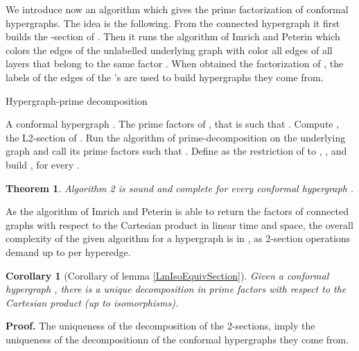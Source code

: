 \documentclass[copyright]{eptcs}
\def\Proof{{\noindent \bf Proof. }}
\def\QED{{\hfill  \medskip}}
\newtheorem{Theo}{Theorem}
\newtheorem{Cor}{Corollary}
\newcommand{\chg}[1]{{#1}}
\begin{document}
We introduce now an algorithm which gives the prime factorization of conformal hypergraphs. The idea is the following. From the connected hypergraph  it first builds the -section  of . Then it runs the algorithm of Imrich and Peterin which colors the edges of the unlabelled underlying graph  with color  all edges of all layers that belong to the same factor . When obtained the factorization  of , the labels of the edges of the 's are used to build hypergraphs  they come from.

    \begin{algorithm}[!h]
        \caption{Hypergraph-prime decomposition}
        \label{algo2}
        \begin{algorithmic}[1]
        \REQUIRE A conformal hypergraph .
        \ENSURE The prime factors of , that is  such that
        .
    \STATE Compute , the L2-section of .
    \STATE Run the algorithm of prime-decomposition on the underlying graph  and call  its prime factors such that .
    \STATE Define  as the restriction of  to , , and build , for every .
\RETURN 
\end{algorithmic}
    \end{algorithm}


\begin{Theo} Algorithm 2 is sound and complete for every conformal hypergraph .
\end{Theo}


As the algorithm of Imrich and Peterin is able to return the factors of connected graphs with respect to the Cartesian product in linear time and space, the overall complexity of the given algorithm for a hypergraph  is in , as 2-section operations demand up to  per hyperedge.

\chg{
\begin{Cor}[Corollary of lemma \ref{LmIsoEquivSection}]
 Given a conformal hypergraph , there is a unique decomposition in prime factors with respect to the Cartesian product (up to isomorphisms).
\end{Cor}
\Proof
 The uniqueness of the decomposition of the 2-sections, imply the uniqueness of the decompositionn of the conformal hypergraphs they come from. \QED}
\end{document}
